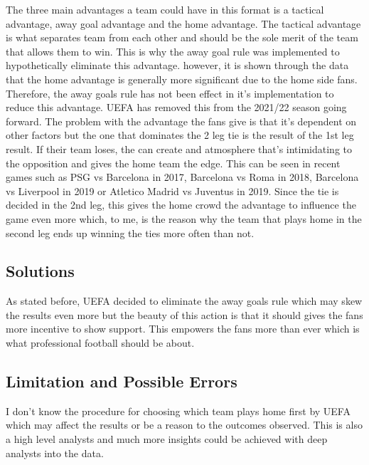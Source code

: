 \documentclass[
]{article}
\begin{document}
The three main advantages a team could have in this format is a tactical
advantage, away goal advantage and the home advantage. The tactical
advantage is what separates team from each other and should be the sole
merit of the team that allows them to win. This is why the away goal
rule was implemented to hypothetically eliminate this advantage.
however, it is shown through the data that the home advantage is
generally more significant due to the home side fans. Therefore, the
away goals rule has not been effect in it's implementation to reduce
this advantage. UEFA has removed this from the 2021/22 season going
forward. The problem with the advantage the fans give is that it's
dependent on other factors but the one that dominates the 2 leg tie is
the result of the 1st leg result. If their team loses, the can create
and atmosphere that's intimidating to the opposition and gives the home
team the edge. This can be seen in recent games such as PSG vs Barcelona
in 2017, Barcelona vs Roma in 2018, Barcelona vs Liverpool in 2019 or
Atletico Madrid vs Juventus in 2019. Since the tie is decided in the 2nd
leg, this gives the home crowd the advantage to influence the game even
more which, to me, is the reason why the team that plays home in the
second leg ends up winning the ties more often than not.

\hypertarget{solutions}{%
\subsection{Solutions}\label{solutions}}

As stated before, UEFA decided to eliminate the away goals rule which
may skew the results even more but the beauty of this action is that it
should gives the fans more incentive to show support. This empowers the
fans more than ever which is what professional football should be about.

\hypertarget{limitation-and-possible-errors}{%
\subsection{Limitation and Possible
Errors}\label{limitation-and-possible-errors}}

I don't know the procedure for choosing which team plays home first by
UEFA which may affect the results or be a reason to the outcomes
observed. This is also a high level analysts and much more insights
could be achieved with deep analysts into the data.
\end{document}
